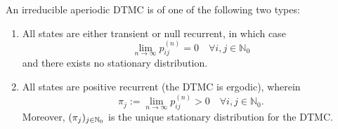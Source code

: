 \documentclass[a4paper,10pt,english]{article}
\begin{document}
\begin{thm}
  An irreducible aperiodic DTMC is of one of the following two types:
\begin{enumerate}
	\item All states are either transient or null recurrent, in which case \[\lim_{n \to \infty} p_{ij}^{(n)} = 0 \quad \forall i,j \in \mathbb{N}_0\] and there exists no stationary distribution.
	\item All states are positive recurrent (the DTMC is ergodic), wherein
          \[ \pi_j := \lim_{n \to \infty} p_{ij}^{(n)} > 0 \quad
          \forall i,j \in \mathbb{N}_0.\]
          Moreover, $(\pi_j)_{j \in \mathbb{N}_0}$ is the unique stationary
          distribution for the DTMC.
\end{enumerate}
\end{thm}
\end{document}
